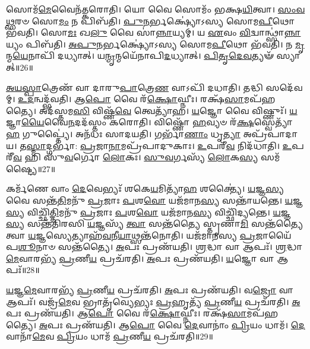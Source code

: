 𑌸𑍋𑌮᳴\-\ul{𑌮𑍇}\-𑌵𑍈𑌨᳴𑌤𑍍𑌕𑌰𑍋𑌤𑌿।
𑌯𑍋 𑌵𑍈 𑌸𑍋𑌮𑌂᳴ 𑌭𑌕𑍍𑌷\-\ul{𑌯𑌿}\-𑌤𑍍𑌵𑌾।
\-\ul{𑌸𑌂}\-\-\ul{𑌵}\-\-\ul{𑌥𑍍𑌸}\-𑌰𑍞 𑌸𑍋\-\ul{𑌮𑌂} 𑌨 𑌪𑌿𑌬᳴𑌤𑌿।
\-\ul{𑌪𑍁}\-\-\ul{𑌨}\-𑌰𑍍𑌭𑌕𑍍𑌷𑍍𑌯𑍋॑𑌽𑌸𑍍𑌯 𑌸𑍋𑌮\-\ul{𑌪𑍀}\-𑌥𑍋 𑌭᳴𑌵𑌤𑌿।
𑌸𑍋\-\ul{𑌮𑌃} 𑌖\-\ul{𑌲𑍁} 𑌵𑍈 𑌸𑌾॑\-\ul{𑌨𑍍𑌨𑌾}\-𑌯𑍍𑌯𑌮𑍍।
𑌯 \ul{𑌏}\-𑌵𑌂 \ul{𑌵𑌿}\-𑌦𑍍𑌵𑌾𑌨𑍍𑌥𑍍𑌸𑌾॑\-\ul{𑌨𑍍𑌨𑌾}\-𑌯𑍍𑌯𑌂 𑌪𑌿𑌬᳴𑌤𑌿।
\-\ul{𑌅}\-\-\ul{𑌪𑍁}\-\-\ul{𑌨}\-𑌰𑍍𑌭𑌕𑍍𑌷𑍍𑌯𑍋॑𑌽𑌸𑍍𑌯 𑌸𑍋𑌮\-\ul{𑌪𑍀}\-𑌥𑍋 𑌭᳴𑌵𑌤𑌿।
𑌨 \ul{𑌮𑍃}\-𑌨𑍍𑌮\-\ul{𑌯𑍇}\-𑌨𑌾𑌪𑌿᳴ 𑌦𑌧𑍍𑌯𑌾𑌤𑍍।
𑌯\-\ul{𑌨𑍍𑌮𑍃}\-𑌨𑍍𑌮𑌯𑍇᳴𑌨𑌾𑌪𑌿\-\ul{𑌦}\-𑌧𑍍𑌯𑌾𑌤𑍍।
\-\ul{𑌪𑌿}\-\-\ul{𑌤𑍃}\-\-\ul{𑌦𑍇}\-\-\ul{𑌵}\-𑌤𑍍𑌯𑍟᳴ 𑌸𑍍𑌯𑌾𑌤𑍍॥26॥

\-\ul{𑌅}\-\-\ul{𑌯}\-\-\ul{𑌸𑍍𑌪𑌾}\-𑌤𑍍𑌰𑍇𑌣᳴ 𑌵𑌾 𑌦𑌾𑌰𑍁\-\ul{𑌪𑌾}\-𑌤𑍍𑌰𑍇\-\ul{𑌣} 𑌵𑌾𑌽𑌪𑌿᳴ 𑌦𑌧𑌾𑌤𑌿।
𑌤𑌦𑍍𑌧𑌿 𑌸𑌦𑍇᳴𑌵𑌮𑍍।
\-\ul{𑌉}\-\-\ul{𑌦}\-𑌨𑍍𑌵𑌦𑍍𑌭᳴𑌵𑌤𑌿।
𑌆\-\ul{𑌪𑍋} 𑌵𑍈 𑌰᳴\-\ul{𑌕𑍍𑌷𑍋}\-𑌘𑍍𑌨𑍀𑌃।
𑌰𑌕𑍍𑌷᳴\-\ul{𑌸𑌾}\-𑌮𑌪᳴𑌹𑌤𑍍𑌯𑍈।
𑌅𑌦᳴𑌸𑍍𑌤𑌮\-\ul{𑌸𑌿} 𑌵𑌿𑌷𑍍𑌣᳴\-\ul{𑌵𑍇} 𑌤𑍍𑌵𑍇𑌤𑍍𑌯𑌾᳴𑌹।
\-\ul{𑌯}\-𑌜𑍍𑌞𑍋 𑌵𑍈 𑌵𑌿𑌷𑍍𑌣𑍁𑌃᳴।
\-\ul{𑌯}\-𑌜𑍍𑌞𑌾\-\ul{𑌯𑍈}\-𑌵𑍈\-\ul{𑌨}\-𑌦𑌦᳴𑌸𑍍𑌤𑌂 𑌕𑌰𑍋𑌤𑌿।
𑌵𑌿𑌷𑍍𑌣𑍋᳴ \ul{𑌹}\-𑌵𑍍𑌯𑍞 𑌰᳴\-\ul{𑌕𑍍𑌷}\-𑌸𑍍𑌵𑍇𑌤𑍍𑌯𑌾᳴\-\ul{𑌹} 𑌗𑍁𑌪𑍍𑌤𑍍𑌯𑍈॑।
𑌅𑌨᳴𑌧𑌃 𑌸𑌾𑌦𑌯𑌤𑌿।
𑌗𑌰𑍍𑌭𑌾᳴\-\ul{𑌣𑌾𑌂} 𑌧𑍃\-\ul{𑌤𑍍𑌯𑌾} 𑌅𑌪𑍍𑌰᳴𑌪𑌾𑌦𑌾𑌯।
𑌤\-\ul{𑌸𑍍𑌮𑌾}\-𑌦𑍍𑌗𑌰𑍍𑌭𑌾॑: \ul{𑌪𑍍𑌰}\-𑌜𑌾\-\ul{𑌨𑌾}\-𑌮𑌪𑍍𑌰᳴𑌪𑌾𑌦𑍁𑌕𑌾𑌃।
\-\ul{𑌉}\-𑌪𑌰𑍀᳴\-\ul{𑌵} 𑌨𑌿𑌦᳴𑌧𑌾𑌤𑌿।
\-\ul{𑌉}\-𑌪𑌰𑍀᳴\-\ul{𑌵} 𑌹𑌿 𑌸𑍁᳴\-\ul{𑌵}\-𑌰𑍍𑌗𑍋 \ul{𑌲𑍋}\-𑌕𑌃।
\-\ul{𑌸𑍁}\-\-\ul{𑌵}\-𑌰𑍍𑌗𑌸𑍍𑌯᳴ \ul{𑌲𑍋}\-𑌕\-\ul{𑌸𑍍𑌯} 𑌸𑌮᳴𑌷𑍍𑌟𑍍𑌯𑍈॥27॥\anuvakamend[\-\ul{𑌅}\-𑌸𑍀𑌤𑍍𑌯𑌾᳴\-\ul{𑌹} 𑌧𑍃\-\ul{𑌤𑍍𑌯𑍈} 𑌯𑌜᳴𑌮𑌾𑌨𑍇 𑌦\-\ul{𑌧𑌾}\-𑌤𑍍𑌯𑌜𑌾᳴𑌮𑌿𑌤𑍍𑌵𑌾𑌯 𑌸𑍍𑌥𑌾𑌪𑌯𑌤𑌿 𑌦𑍁𑌹𑍇 𑌦𑍁𑌹𑌨𑍍𑌤𑌿 \ul{𑌦𑍁}\-𑌹𑍍𑌯𑌾𑌦𑍍𑌦𑍋𑌗𑍍𑌧𑍀\-\ul{𑌤𑌿} 𑌦𑌧𑍀𑌤𑍍𑌯𑌾᳴𑌹 𑌸𑍍𑌯𑌾𑌥𑍍𑌸𑌾𑌦𑌯\-\ul{𑌤𑌿} 𑌪𑌞𑍍𑌚᳴ 𑌚]

𑌕𑌰𑍍𑌮᳴𑌣𑍇 𑌵𑌾𑌂 \ul{𑌦𑍇}\-𑌵𑍇𑌭𑍍𑌯𑌃᳴ 𑌶𑌕𑍇\-\ul{𑌯}\-𑌮𑌿𑌤𑍍𑌯𑌾᳴\-\ul{𑌹} 𑌶𑌕𑍍𑌤𑍍𑌯𑍈॑।
\-\ul{𑌯}\-𑌜𑍍𑌞\-\ul{𑌸𑍍𑌯} 𑌵𑍈 𑌸𑌨𑍍𑌤᳴\-\ul{𑌤𑌿}\-𑌮𑌨𑍁᳴ \ul{𑌪𑍍𑌰}\-𑌜𑌾𑌃 \ul{𑌪}\-𑌶\-\ul{𑌵𑍋} 𑌯𑌜᳴𑌮𑌾𑌨\-\ul{𑌸𑍍𑌯} 𑌸𑌨𑍍𑌤𑌾᳴𑌯𑌨𑍍𑌤𑍇।
\-\ul{𑌯}\-𑌜𑍍𑌞\-\ul{𑌸𑍍𑌯} 𑌵𑌿𑌚𑍍𑌛𑌿᳴\-\ul{𑌤𑍍𑌤𑌿}\-𑌮𑌨𑍁᳴ \ul{𑌪𑍍𑌰}\-𑌜𑌾𑌃 \ul{𑌪}\-𑌶\-\ul{𑌵𑍋} 𑌯𑌜᳴𑌮𑌾𑌨\-\ul{𑌸𑍍𑌯} 𑌵𑌿𑌚𑍍𑌛𑌿᳴𑌦𑍍𑌯𑌨𑍍𑌤𑍇।
\-\ul{𑌯}\-𑌜𑍍𑌞\-\ul{𑌸𑍍𑌯} 𑌸𑌨𑍍𑌤᳴𑌤𑌿𑌰𑌸𑌿 \ul{𑌯}\-𑌜𑍍𑌞𑌸𑍍𑌯᳴ \ul{𑌤𑍍𑌵𑌾} 𑌸𑌨𑍍𑌤᳴𑌤𑍍𑌯𑍈 𑌸𑍍𑌤𑍃𑌣𑌾\-\ul{𑌮𑌿} 𑌸𑌨𑍍𑌤᳴𑌤𑍍𑌯𑍈 𑌤𑍍𑌵𑌾 \ul{𑌯}\-𑌜𑍍𑌞𑌸𑍍𑌯𑍇𑌤𑍍𑌯𑌾𑌹᳴\-\ul{𑌵}\-𑌨𑍀\-\ul{𑌯𑌾}\-𑌥𑍍𑌸𑌨𑍍𑌤᳴𑌨𑍋𑌤𑌿।
𑌯𑌜᳴𑌮𑌾𑌨𑌸𑍍𑌯 \ul{𑌪𑍍𑌰}\-𑌜𑌾𑌯𑍈᳴ 𑌪\-\ul{𑌶𑍂}\-𑌨𑌾𑍞 𑌸𑌨𑍍𑌤᳴𑌤𑍍𑌯𑍈।
\-\ul{𑌅}\-𑌪𑌃 𑌪𑍍𑌰𑌣᳴𑌯𑌤𑌿।
\-\ul{𑌶𑍍𑌰}\-𑌦𑍍𑌧𑌾 𑌵𑌾 𑌆𑌪𑌃᳴।
\-\ul{𑌶𑍍𑌰}\-𑌦𑍍𑌧𑌾\-\ul{𑌮𑍇}\-𑌵𑌾𑌰𑌭𑍍𑌯᳴ \ul{𑌪𑍍𑌰}\-𑌣𑍀\-\ul{𑌯} 𑌪𑍍𑌰𑌚᳴𑌰𑌤𑌿।
\-\ul{𑌅}\-𑌪𑌃 𑌪𑍍𑌰𑌣᳴𑌯𑌤𑌿।
\-\ul{𑌯}\-𑌜𑍍𑌞𑍋 𑌵𑌾 𑌆𑌪𑌃᳴॥28॥

\-\ul{𑌯}\-𑌜𑍍𑌞\-\ul{𑌮𑍇}\-𑌵𑌾𑌰𑌭𑍍𑌯᳴ \ul{𑌪𑍍𑌰}\-𑌣𑍀\-\ul{𑌯} 𑌪𑍍𑌰𑌚᳴𑌰𑌤𑌿।
\-\ul{𑌅}\-𑌪𑌃 𑌪𑍍𑌰𑌣᳴𑌯𑌤𑌿।
𑌵\-\ul{𑌜𑍍𑌰𑍋} 𑌵𑌾 𑌆𑌪𑌃᳴।
𑌵𑌜𑍍𑌰᳴\-\ul{𑌮𑍇}\-𑌵 𑌭𑍍𑌰𑌾𑌤𑍃᳴𑌵𑍍𑌯𑍇𑌭𑍍𑌯𑌃 \ul{𑌪𑍍𑌰}\-𑌹𑍃𑌤𑍍𑌯᳴ \ul{𑌪𑍍𑌰}\-𑌣𑍀\-\ul{𑌯} 𑌪𑍍𑌰𑌚᳴𑌰𑌤𑌿।
\-\ul{𑌅}\-𑌪𑌃 𑌪𑍍𑌰𑌣᳴𑌯𑌤𑌿।
𑌆\-\ul{𑌪𑍋} 𑌵𑍈 𑌰᳴\-\ul{𑌕𑍍𑌷𑍋}\-𑌘𑍍𑌨𑍀𑌃।
𑌰𑌕𑍍𑌷᳴\-\ul{𑌸𑌾}\-𑌮𑌪᳴𑌹𑌤𑍍𑌯𑍈।
\-\ul{𑌅}\-𑌪𑌃 𑌪𑍍𑌰𑌣᳴𑌯𑌤𑌿।
𑌆\-\ul{𑌪𑍋} 𑌵𑍈 \ul{𑌦𑍇}\-𑌵𑌾𑌨𑌾𑌂॑ \ul{𑌪𑍍𑌰𑌿}\-𑌯𑌂 𑌧𑌾𑌮᳴।
\-\ul{𑌦𑍇}\-𑌵𑌾𑌨𑌾᳴\-\ul{𑌮𑍇}\-𑌵 \ul{𑌪𑍍𑌰𑌿}\-𑌯𑌂 𑌧𑌾𑌮᳴ \ul{𑌪𑍍𑌰}\-𑌣𑍀\-\ul{𑌯} 𑌪𑍍𑌰𑌚᳴𑌰𑌤𑌿॥29॥

